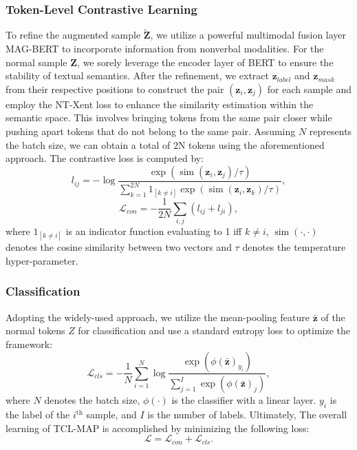\documentclass[letterpaper]{article}
\begin{document}
\subsubsection{Token-Level Contrastive Learning}
To refine the augmented sample $\widetilde{\textbf{Z}}$, we utilize a powerful multimodal fusion layer MAG-BERT \cite{rahman2020integrating} to incorporate information from nonverbal modalities. For the normal sample $\textbf{Z}$, we sorely leverage the encoder layer of BERT \cite{devlin2018bert} to ensure the stability of textual semantics. After the refinement, we extract $\textbf{z}_{label}$ and $\textbf{z}_{mask}$ from their respective positions to construct the pair $(\textbf{z}_{i}, \textbf{z}_{j})$ for each sample and employ the NT-Xent \cite{sohn2016improved} loss to enhance the similarity estimation within the semantic space. This involves bringing tokens from the same pair closer while pushing apart tokens that do not belong to the same pair. Assuming $N$ represents the batch size, we can obtain a total of 2N tokens using the aforementioned approach. The contrastive loss is computed by:
\begin{equation}
l_{ij}=-\log \frac{\exp \left(\operatorname{sim}\left(\textbf{z}_i, \textbf{z}_j\right) / \tau\right)}{\sum_{k=1}^{2 N} 1_{[k \neq i]} \exp \left(\operatorname{sim}\left(\textbf{z}_i, \textbf{z}_k\right) / \tau\right)},
\end{equation}
\begin{equation}
\mathcal{L}_{con} = -\frac{1}{2N}\sum_{i,j}(l_{ij}+l_{ji}),
\end{equation}
where $1_{[k \neq i]}$ is an indicator function evaluating to 1 iff $k \neq i$, $\operatorname{sim}(\cdot, \cdot)$ denotes the cosine similarity between two vectors and $\tau$ denotes the temperature hyper-parameter.
\subsubsection{Classification}
Adopting the widely-used approach, we utilize the mean-pooling feature $\bar{\textbf{z}}$ of the normal tokens $Z$ for classification and use a standard entropy loss to optimize the framework:
\begin{equation}
\mathcal{L}_{cls}=-\frac{1}{N}\sum_{i=1}^{N} \log\frac{\exp(\phi(\bar{\textbf{z}})_{y_{i}})}{\sum_{j=1}^{I}\exp(\phi(\bar{\textbf{z}})_{j})},
\end{equation}
where $N$ denotes the batch size, $\phi(\cdot)$ is the classifier with a linear layer. $y_{i}$ is the label of the $i^{\text{th}}$ sample, and $I$ is the number of labels. Ultimately, The overall learning of TCL-MAP is accomplished by minimizing the following loss:
\begin{equation}
\mathcal{L} = \mathcal{L}_{con} + \mathcal{L}_{cls}.
\end{equation}
\end{document}
